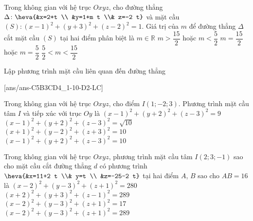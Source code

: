 \begin{ex}%
	Trong không gian với hệ trục $Oxyz$, cho đường thẳng $\Delta\colon\heva{&x=2+t \\ &y=1+m t \\& z=-2 t}$ và mặt cầu $(S)\colon (x-1)^2+(y+3)^2+(z-2)^2=1$. Giá trị của $m$ để đường thẳng $\Delta$ cắt mặt cầu $(S)$ tại hai điểm phân biệt là
	\choice 
		{$m \in \mathbb{R}$}
		{$m>\dfrac{15}{2}$ hoặc $m<\dfrac{5}{2}$}
		{$m=\dfrac{15}{2}$ hoặc $m=\dfrac{5}{2}$}
		{\True $\dfrac{5}{2}<m<\dfrac{15}{2}$}
\end{ex}
\begin{dang}{Lập phương trình mặt cầu liên quan đến đường thẳng}
\end{dang}
\TN
{}[ans/ans-C5B3CD4_1-10-D2-LC]
\begin{ex}%
	Trong không gian với hệ trục $Oxyz$, cho điểm $I(1;-2;3)$. Phương trình mặt cầu tâm $I$ và tiếp xúc với trục $Oy$ là
	\choice 
		{$(x-1)^2+(y+2)^2+(z-3)^2=9$}
		{$(x-1)^2+(y+2)^2+(z-3)^2=\sqrt{10}$}
		{$(x+1)^2+(y-2)^2+(z+3)^2=10$}
		{\True $(x-1)^2+(y+2)^2+(z-3)^2=10$}
\end{ex}

\begin{ex}%
	Trong không gian với hệ trục $Oxyz$, phương trình mặt cầu tâm $I(2;3;-1)$ sao cho mặt cầu cắt đường thẳng $d$ có phương trình $\heva{&x=11+2 t \\& y=t \\ &z=-25-2 t}$ tại hai điểm $A$, $B$ sao cho $AB=16$ là
	\choice 
		{$(x-2)^2+(y-3)^2+(z+1)^2=280$}
		{$(x+2)^2+(y+3)^2+(z-1)^2=289$}
		{$(x-2)^2+(y-3)^2+(z+1)^2=17$}
		{\True $(x-2)^2+(y-3)^2+(z+1)^2=289$}
\end{ex}

